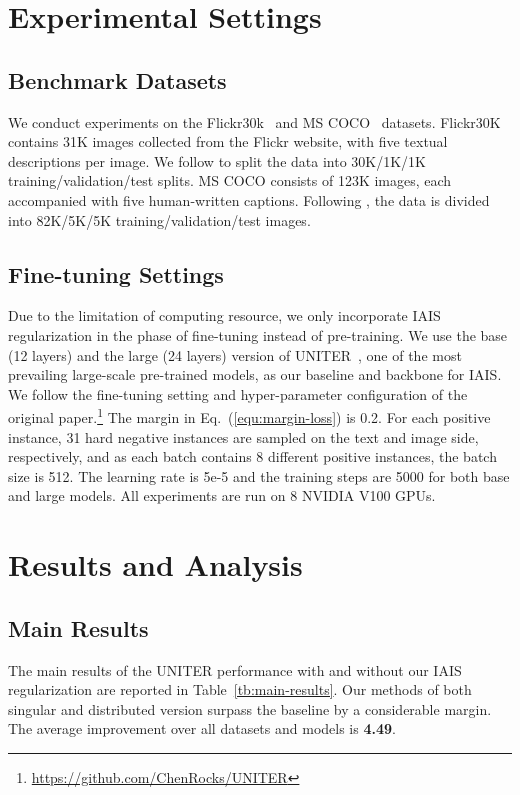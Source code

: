 \documentclass[11pt,a4paper]{article}
\begin{document}
\section{Experimental Settings}
\subsection{Benchmark Datasets}
We conduct experiments on the Flickr30k~\cite{Flickr30k} and MS COCO~\cite{COCO} datasets. 
Flickr30K contains 31K images collected from the Flickr website, with five textual descriptions per image. We follow \citet{Deep-visual-semantic-alignments} to split the data into 30K/1K/1K training/validation/test splits. 
MS COCO consists of 123K images, each accompanied with five human-written captions. 
Following \citet{Deep-visual-semantic-alignments}, the data is divided into 82K/5K/5K training/validation/test images. 

\subsection{Fine-tuning Settings}
Due to the limitation of computing resource, we only incorporate IAIS regularization in the phase of fine-tuning instead of pre-training. 
We use the base (12 layers) and the large (24 layers) version of UNITER~\cite{UNITER}, one of the most prevailing large-scale pre-trained models, as our baseline and backbone for IAIS. 
We follow the fine-tuning setting and hyper-parameter configuration of the original paper.\footnote{\url{https://github.com/ChenRocks/UNITER}}  
The margin in Eq.~(\ref{equ:margin-loss}) is 0.2. 
For each positive instance, 31 hard negative instances are sampled on the text and image side, respectively, and as each batch contains 8 different positive instances, the batch size is 512.
The learning rate is 5e-5 and the training steps are 5000 for both base and large models. 
All experiments are run on 8 NVIDIA V100 GPUs. 

\section{Results and Analysis}
\subsection{Main Results}
The main results of the UNITER performance with and without our IAIS regularization are reported in Table~\ref{tb:main-results}. 
Our methods of both singular and distributed version surpass the baseline by a considerable margin. 
The average improvement over all datasets and models is \textbf{4.49}.
\end{document}

